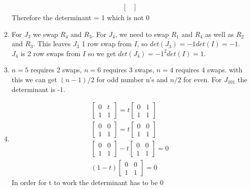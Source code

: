 \documentclass[]{exam}
\begin{document}
\begin{questions}
\begin{solution}
\begin{enumerate}
\begin{parts}
\begin{gather*}
\begin{bmatrix}
                        \end{bmatrix} 
                    \end{gather*}
                    Therefore the determinant = 1 which is not 0
            \end{parts}
            \item For $J_3$ we swap $R_4$ and $R_3$. For $J_4$, we need to swap $R_1$ and $R_4$ as well as  $R_2$ and $R_3$. This leaves $J_3$ 1 row swap from $I$, so $det(J_3)=-1det(I)=-1$. $J_4$ is 2 row swaps from $I$ so we get $det(J_4)=-1^2det(I)=1$.
            \item $n=5$ requires 2 swaps, $n=6$ requires 3 swaps, $n=4$ requires 4 swaps.  with this we can get $(n-1)/2$ for odd number n's and $n/2$ for even.  For $J_{101}$ the determinant is -1.
            \item
            \begin{gather*}
                \begin{bmatrix}
                0 & t \\
                1 & 1
                \end{bmatrix}=t
                \begin{bmatrix}
                0 & 1 \\
                1 & 1
                \end{bmatrix} \\
                \begin{bmatrix}
                0 & 0 \\
                1 & 1
                \end{bmatrix}=t
                \begin{bmatrix}
                0 & 0 \\
                1 & 1
                \end{bmatrix} \\
                \begin{bmatrix}
                0 & 0 \\
                1 & 1
                \end{bmatrix}-t
                \begin{bmatrix}
                0 & 0 \\
                1 & 1
                \end{bmatrix}=0
                \\
                (1-t)
                \begin{bmatrix}
                0 & 0 \\
                1 & 1
                \end{bmatrix} = 0
            \end{gather*}
            In order for t to work the determinant has to be 0
        \end{enumerate}
	\end{solution}
	

\end{questions}
\end{document}
